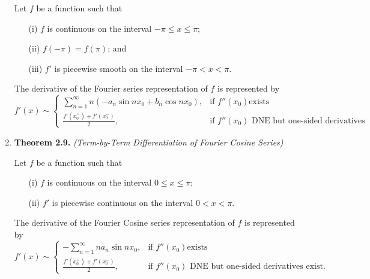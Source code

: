 \begin{enumerate}
Let $f$ be a function such that
\begin{itemize}
\item[(i)] $f$ is continuous on the interval $-\pi \leq x \leq \pi$;
\item[(ii)] $f (-\pi) = f (\pi)$; and
\item[(iii)] $f'$ is piecewise smooth on the interval $-\pi < x < \pi$.
\end{itemize}

The derivative of the Fourier series representation of $f$ is represented by
\[
f'(x) \sim
\begin{cases}
\displaystyle \sum_{n=1}^{\infty}n(-a_{n}\sin nx_{0} + b_{n} \cos nx_{0}), & \text{if  $f''(x _{0} )$
exists} \\
\displaystyle \frac{f'(x_{0}^{+})+f'(x_{0}^{-})}{2}, & \text{if $f '' (x _{0} )$ DNE but one-sided derivatives exist.}
\end{cases}
\]


\item \textbf{Theorem 2.9.} \textit{(Term-by-Term Differentiation of Fourier Cosine Series)}

Let $f$ be a function such that
\begin{itemize}
 \item[(i)] $f$ is continuous on the interval $0 \leq x \leq \pi$;
 \item[(ii)] $f'$ is piecewise continuous on the interval $0 < x < \pi$.
\end{itemize}
The derivative of the Fourier Cosine series representation of $f$ is represented by
\[
f'(x) \sim
\begin{cases}
\displaystyle -\sum_{n=1}^{\infty}na_{n}\sin nx_{0} , & \text{if  $f''(x _{0} )$
exists} \\
\displaystyle \frac{f'(x_{0}^{+})+f'(x_{0}^{-})}{2}, & \text{if $f '' (x _{0} )$ DNE but one-sided derivatives exist.}
\end{cases}
\]


\end{enumerate}

